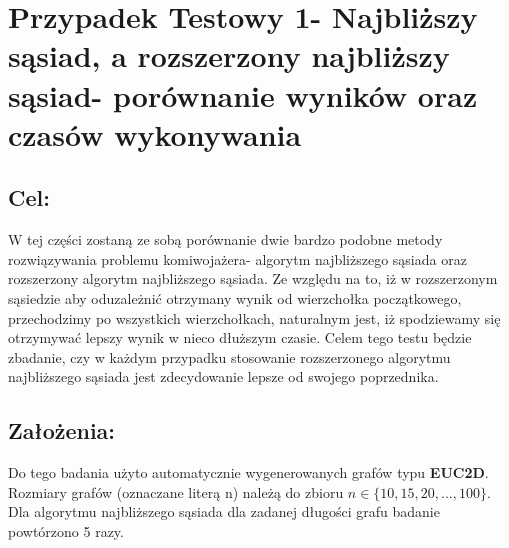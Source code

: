 \section{Przypadek Testowy 1- Najbliższy sąsiad, a rozszerzony najbliższy sąsiad- porównanie wyników oraz czasów wykonywania}
  \subsection{Cel:}
    W tej części zostaną ze sobą porównanie dwie bardzo podobne metody rozwiązywania problemu komiwojażera- algorytm najbliższego sąsiada oraz rozszerzony algorytm najbliższego sąsiada. Ze względu na to, iż w rozszerzonym sąsiedzie aby oduzależnić otrzymany wynik od wierzchołka początkowego, przechodzimy po wszystkich wierzchołkach, naturalnym jest, iż spodziewamy się otrzymywać lepszy wynik w nieco dłuższym czasie. Celem tego testu będzie zbadanie, czy w każdym przypadku stosowanie rozszerzonego algorytmu najbliższego sąsiada jest zdecydowanie lepsze od swojego poprzednika. 
  \subsection{Założenia:}
    Do tego badania użyto automatycznie wygenerowanych grafów typu \textbf{EUC2D}. Rozmiary grafów (oznaczane literą n) należą do zbioru $n \in \{10,15,20,...,100\}$. Dla algorytmu najbliższego sąsiada dla zadanej długości grafu badanie powtórzono 5 razy.

